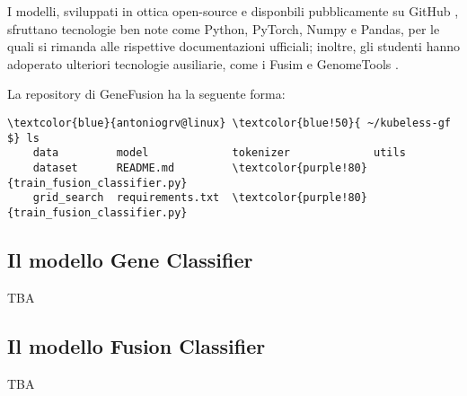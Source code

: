I modelli, sviluppati in ottica open-source e disponbili pubblicamente su GitHub \cite{kubeless_gf}, sfruttano tecnologie ben note come Python, PyTorch, Numpy e Pandas, per le quali si rimanda alle rispettive documentazioni ufficiali; inoltre, gli studenti hanno adoperato ulteriori tecnologie ausiliarie, come i Fusim \cite{fusim} e GenomeTools \cite{gt}.

La repository di GeneFusion ha la seguente forma:

\begin{small}
\begin{Verbatim}[commandchars=\\\{\}]
    \textcolor{blue}{antoniogrv@linux} \textcolor{blue!50}{ ~/kubeless-gf $} ls
    data         model             tokenizer             utils
    dataset      README.md         \textcolor{purple!80}{train_fusion_classifier.py}
    grid_search  requirements.txt  \textcolor{purple!80}{train_fusion_classifier.py}

\end{Verbatim}
\end{small}

\subsection{Il modello Gene Classifier}

TBA

\subsection{Il modello Fusion Classifier}

TBA